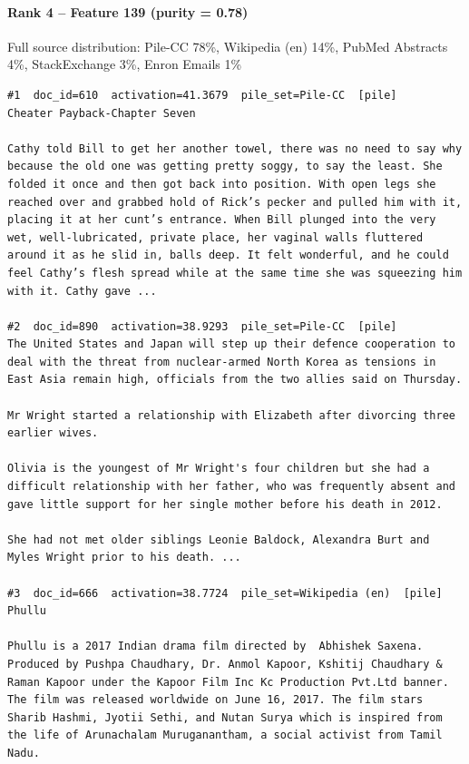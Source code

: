 \paragraph*{Rank 4 -- Feature 139 (purity = 0.78)}

Full source distribution: Pile-CC 78\%, Wikipedia (en) 14\%, PubMed Abstracts 4\%, StackExchange 3\%, Enron Emails 1\%

\begin{verbatim}
#1  doc_id=610  activation=41.3679  pile_set=Pile-CC  [pile]
Cheater Payback-Chapter Seven

Cathy told Bill to get her another towel, there was no need to say why because the old one was getting pretty soggy, to say the least. She folded it once and then got back into position. With open legs she reached over and grabbed hold of Rick’s pecker and pulled him with it, placing it at her cunt’s entrance. When Bill plunged into the very wet, well-lubricated, private place, her vaginal walls fluttered around it as he slid in, balls deep. It felt wonderful, and he could feel Cathy’s flesh spread while at the same time she was squeezing him with it. Cathy gave ...

#2  doc_id=890  activation=38.9293  pile_set=Pile-CC  [pile]
The United States and Japan will step up their defence cooperation to deal with the threat from nuclear-armed North Korea as tensions in East Asia remain high, officials from the two allies said on Thursday.

Mr Wright started a relationship with Elizabeth after divorcing three earlier wives.

Olivia is the youngest of Mr Wright's four children but she had a difficult relationship with her father, who was frequently absent and gave little support for her single mother before his death in 2012.

She had not met older siblings Leonie Baldock, Alexandra Burt and Myles Wright prior to his death. ...

#3  doc_id=666  activation=38.7724  pile_set=Wikipedia (en)  [pile]
Phullu

Phullu is a 2017 Indian drama film directed by  Abhishek Saxena. Produced by Pushpa Chaudhary, Dr. Anmol Kapoor, Kshitij Chaudhary & Raman Kapoor under the Kapoor Film Inc Kc Production Pvt.Ltd banner. The film was released worldwide on June 16, 2017. The film stars Sharib Hashmi, Jyotii Sethi, and Nutan Surya which is inspired from the life of Arunachalam Muruganantham, a social activist from Tamil Nadu. 


\end{verbatim}
